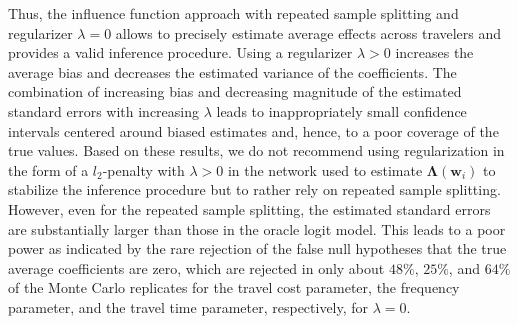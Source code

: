 \documentclass[a4paper, 12pt]{article}
\begin{document}
Thus, the influence function approach with repeated sample splitting and regularizer $\lambda=0$ allows to precisely estimate average effects across travelers and provides a valid inference procedure. Using a regularizer $\lambda>0$ increases the average bias and decreases the estimated variance of the coefficients.
The combination of increasing bias and decreasing magnitude of the estimated standard errors with increasing $\lambda$ leads to inappropriately small confidence intervals centered around biased estimates and, hence, to a poor coverage of the true values. Based on these results, we do not recommend using regularization in the form of a $l_2$-penalty with $\lambda > 0$ in the network used to estimate $\bm{\Lambda}(\bm{w}_i)$ to stabilize the inference procedure but to rather rely on repeated sample splitting.
However, even for the repeated sample splitting, the estimated standard errors are substantially larger than those in the oracle logit model. This leads to a poor power as indicated by the rare rejection of the false null hypotheses that the true average coefficients are zero, which are rejected in only about $48\%$, $25\%$, and $64\%$ of the Monte Carlo replicates for the travel cost parameter, the frequency parameter, and  the travel time parameter, respectively, for $\lambda=0$.
\end{document}
